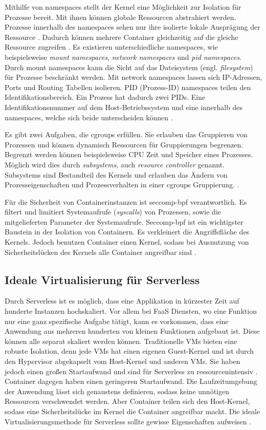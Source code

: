 Mithilfe von namespaces stellt der Kernel eine Möglichkeit zur Isolation
für Prozesse bereit. Mit ihnen können globale Ressourcen abstrahiert werden.
Prozesse innerhalb des namespaces sehen nur ihre isolierte lokale
Ausprägung der Ressource \cite{UbuntuNamespaces}.
Dadurch können mehrere Container gleichzeitig auf die gleiche
Ressource zugreifen \cite{RedHatIntroToLinuxContainers}.
Es existieren unterschiedliche namespaces, wie beispielsweise
\emph{mount namespaces}, \emph{network namespaces}
und \emph{pid namespaces}.
Durch mount namespaces kann die Sicht auf das Dateisystem
(engl. \emph{filesystem}) für Prozesse beschränkt werden.
Mit network namespaces lassen sich IP-Adressen, Ports
und Routing Tabellen isolieren. PID (Prozess-ID) namespaces teilen
den Identifikationsbereich. Ein Prozess hat dadurch zwei
PIDs. Eine Identifikationsnummer auf dem Host-Betriebssystem und eine
innerhalb des namespaces, welche sich beide unterscheiden können
\cite{LwnDotNetNamespaces}.

Es gibt zwei Aufgaben, die cgroups erfüllen. Sie erlauben das Gruppieren
von Prozessen und können dynamisch Ressourcen für Gruppierungen begrenzen.
Begrenzt werden können beispielsweise CPU Zeit und Speicher eines Prozesses.
Möglich wird dies durch \emph{subsystems},
auch \emph{resource controller} genannt. Subsystems sind Bestandteil
des Kernels und erlauben das Ändern von Prozesseigenschaften und
Prozessverhalten in einer cgroups Gruppierung. 
\cite{RedHatIntroToLinuxContainers}.

Für die Sicherheit von Containerinstanzen ist seccomp-bpf 
verantwortlich. Es filtert und limitiert
Systemaufrufe (\emph{syscalls}) von Prozessen,
sowie die mitgelieferten Parameter der Systemaufrufe.
Seccomp-bpf ist ein wichtigster Baustein in der Isolation von
Containern. Es verkleinert die Angriffsfläche 
des Kernels. Jedoch benutzen Container einen
Kernel, sodass bei Ausnutzung von Sicherheitslücken
des Kernels alle Container angreifbar sind \cite{Firecracker}.

\subsection{Ideale Virtualisierung für Serverless}
Durch Serverless ist es möglich,
dass eine Applikation in kürzester Zeit
auf hunderte Instanzen hochskaliert. Vor allem bei FaaS Diensten,
wo eine Funktion nur eine ganz spezifische Aufgabe tätigt,
kann es vorkommen, dass eine Anwendung aus mehreren hunderten
von kleinen Funktionen aufgebaut ist. Diese können alle separat
skaliert werden können. Traditionelle VMs bieten
eine robuste Isolation, denn jede VMs hat einen eigenen
Guest-Kernel und ist durch den Hypervisor
abgekapselt vom Host-Kernel und anderen VMs. Sie haben jedoch
einen großen Startaufwand und sind für Serverless zu
ressourcenintensiv \cite{Firecracker}. Container dagegen
haben einen geringeren Startaufwand. Die Laufzeitumgebung der
Anwendung lässt sich genaustens definieren, sodass keine
unnötigen Ressourcen verschwendet werden. Aber Container
teilen sich den Host-Kernel, sodass eine Sicherheitslücke
im Kernel die Container angreifbar macht.
Die ideale Virtualisierungsmethode für Serverless sollte
gewisse Eigenschaften aufweisen \cite{Firecracker}.

